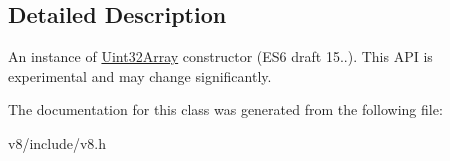 \subsection{Detailed Description}
An instance of \hyperlink{classv8_1_1Uint32Array}{Uint32\+Array} constructor (E\+S6 draft 15..). This A\+P\+I is experimental and may change significantly. 

The documentation for this class was generated from the following file\+:\begin{DoxyCompactItemize}
\item 
v8/include/v8.\+h\end{DoxyCompactItemize}
